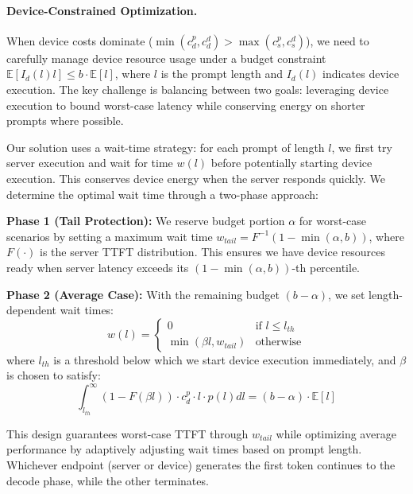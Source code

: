 \paragraph{Device-Constrained Optimization.} 

When device costs dominate ($\min(c^p_d, c^d_d) > \max(c^p_s, c^d_s)$), we need to carefully manage device resource usage under a budget constraint $\mathbb{E}[I_d(l)l] \leq b \cdot \mathbb{E}[l]$, where $l$ is the prompt length and $I_d(l)$ indicates device execution. The key challenge is balancing between two goals: leveraging device execution to bound worst-case latency while conserving energy on shorter prompts where possible.

Our solution uses a wait-time strategy: for each prompt of length $l$, we first try server execution and wait for time $w(l)$ before potentially starting device execution. This conserves device energy when the server responds quickly. We determine the optimal wait time through a two-phase approach:

\begin{denseitemize}
    \item \textbf{Phase 1 (Tail Protection):} We reserve budget portion $\alpha$ for worst-case scenarios by setting a maximum wait time $w_{tail} = F^{-1}(1-\min(\alpha,b))$, where $F(\cdot)$ is the server TTFT distribution. This ensures we have device resources ready when server latency exceeds its $(1-\min(\alpha,b))$-th percentile.
    
    \item \textbf{Phase 2 (Average Case):} With the remaining budget $(b-\alpha)$, we set length-dependent wait times:
    \begin{equation}
        w(l) = \begin{cases}
            0 & \text{if } l \leq l_{th} \\
            \min(\beta l, w_{tail}) & \text{otherwise}
        \end{cases}
    \end{equation}
    where $l_{th}$ is a threshold below which we start device execution immediately, and $\beta$ is chosen to satisfy:
    \begin{equation}
        \int_{l_{th}}^{\infty} (1-F(\beta l)) \cdot c^p_d \cdot l \cdot p(l)dl = (b-\alpha) \cdot \mathbb{E}[l]
    \end{equation}
\end{denseitemize}

This design guarantees worst-case TTFT through $w_{tail}$ while optimizing average performance by adaptively adjusting wait times based on prompt length. Whichever endpoint (server or device) generates the first token continues to the decode phase, while the other terminates.

